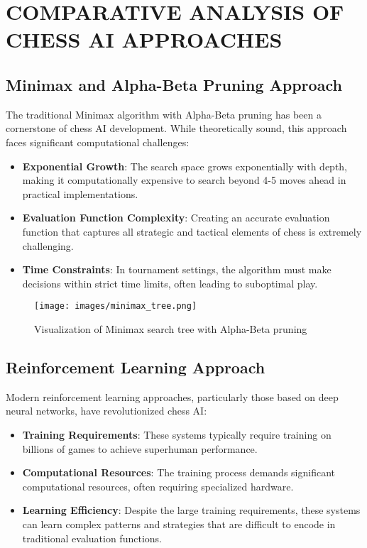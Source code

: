 \documentclass[12pt,a4paper]{report}
\begin{document}
\chapter{COMPARATIVE ANALYSIS OF CHESS AI APPROACHES}

\section{Minimax and Alpha-Beta Pruning Approach}
The traditional Minimax algorithm with Alpha-Beta pruning has been a cornerstone of chess AI development. While theoretically sound, this approach faces significant computational challenges:

\begin{itemize}
    \item \textbf{Exponential Growth}: The search space grows exponentially with depth, making it computationally expensive to search beyond 4-5 moves ahead in practical implementations.
    \item \textbf{Evaluation Function Complexity}: Creating an accurate evaluation function that captures all strategic and tactical elements of chess is extremely challenging.
    \item \textbf{Time Constraints}: In tournament settings, the algorithm must make decisions within strict time limits, often leading to suboptimal play.
\end{itemize}

\begin{figure}[H]
    \centering
    \texttt{[image: images/minimax\_tree.png]}
    \caption{Visualization of Minimax search tree with Alpha-Beta pruning}
    \label{fig:minimax_tree}
\end{figure}

\section{Reinforcement Learning Approach}
Modern reinforcement learning approaches, particularly those based on deep neural networks, have revolutionized chess AI:

\begin{itemize}
    \item \textbf{Training Requirements}: These systems typically require training on billions of games to achieve superhuman performance.
    \item \textbf{Computational Resources}: The training process demands significant computational resources, often requiring specialized hardware.
    \item \textbf{Learning Efficiency}: Despite the large training requirements, these systems can learn complex patterns and strategies that are difficult to encode in traditional evaluation functions.
\end{itemize}
\end{document}
